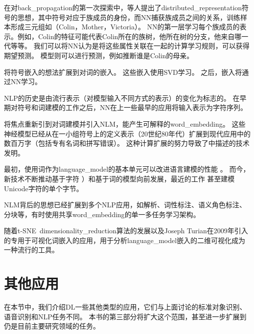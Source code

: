 在对\gls{back_propagation}的第一次探索中，\citet{Rumelhart86b-small}等人提出了\gls{distributed_representation}符号的思想，其中符号对应于族成员的身份，而\gls{NN}捕获族成员之间的关系，训练样本形成三元组如（Colin，Mother，Victoria）。
\gls{NN}的第一层学习每个族成员的表示。例如，Colin的特征可能代表Colin所在的族树，他所在树的分支，他来自哪一代等等。
我们可以将\gls{NN}认为是将这些属性关联在一起的计算学习规则，可以获得期望预测。
模型则可以进行预测，例如推断谁是Colin的母亲。

\cite{Deerwester90}将符号嵌入的想法扩展到对词的嵌入。
这些嵌入使用SVD学习。 
之后，嵌入将通过\gls{NN}学习。

\gls{NLP}的历史是由流行表示（对模型输入不同方式的表示）的变化为标志的。
在早期对符号和词建模的工作之后，\gls{NN}在上一些最早的应用\citep{Miikkulainen91,Schmidhuber96}将输入表示为字符序列。

\citet{BenDucVin01-small} 将焦点重新引到对词建模并引入\gls{NLM}，能产生可解释的\gls{word_embedding}。
这些神经模型已经从在一小组符号上的定义表示（20世纪80年代）扩展到现代应用中的数百万字（包括专有名词和拼写错误）。
这种计算扩展的努力导致了中描述的技术发明。


最初，使用词作为\gls{language_model}的基本单元可以改进语言建模的性能 \citep{BenDucVin01-small}。
而今，新技术不断推动基于字符 \citep{Sutskever-et-al-ICML2011}）和基于词的模型向前发展，最近的工作 \citep{gillick2015multilingual}甚至建模Unicode字符的单个字节。

\gls{NLM}背后的思想已经扩展到多个\gls{NLP}应用，如解析\citep{Henderson-NAACL2003,Henderson-ACL2004,Collobert-AISTATS2011}、词性标注、语义角色标注、分块等，有时使用共享\gls{word_embedding}的单一多任务学习架构\citep{Collobert+Weston-ICML2008,collobert2011natural}。

随着t-SNE~\gls{dimensionality_reduction}算法的发展\citep{VanDerMaaten08-small}以及Joseph Turian在2009年引入的专用于可视化词嵌入的应用，用于分析\gls{language_model}嵌入的二维可视化成为一种流行的工具。

\section{其他应用}
\label{sec:other_applications}

在本节中，我们介绍\gls{DL}一些其他类型的应用，它们与上面讨论的标准对象识别、语音识别和\gls{NLP}任务不同。
本书的第三部分将扩大这个范围，甚至进一步扩展到仍是目前主要研究领域的任务。


